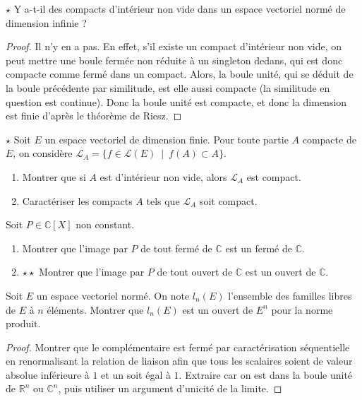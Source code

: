 \documentclass[french,a4paper]{article}
\newcommand{\R}{\mathbb{R}}
\newcommand{\C}{\mathbb{C}}
\theoremstyle{plain}
\theoremstyle{definition}
\theoremstyle{remark}
\begin{document}
\begin{ex}[Moulin.02]{$\star$}
	Y a-t-il des compacts d'intérieur non vide dans un espace vectoriel normé de dimension infinie ?
\end{ex}
\begin{proof}
	Il n'y en a pas. En effet, s'il existe un compact d'intérieur non vide, on peut mettre une boule fermée non réduite à un singleton dedans, qui est donc compacte comme fermé dans un compact. Alors, la boule unité, qui se déduit de la boule précédente par similitude, est elle aussi compacte (la similitude en question est continue). Donc la boule unité est compacte, et donc la dimension est finie d'après le théorème de Riesz.
\end{proof}

\begin{ex}[Moulin.03]{$\star$}
	Soit $E$ un espace vectoriel de dimension finie. Pour toute partie $A$ compacte de $E$, on considère $\mathcal{L}_A=\{f\in\mathcal{L}(E)\ \mid\ f(A)\subset A\}$.
	\begin{enumerate}
		\item Montrer que si $A$ est d'intérieur non vide, alors $\mathcal{L}_A$ est compact.
		\item Caractériser les compacts $A$ tels que $\mathcal{L}_A$ soit compact.
	\end{enumerate}
\end{ex}

\begin{ex}[Moulin.04]{}
	Soit $P\in\C[X]$ non constant.
	\begin{enumerate}
		\item Montrer que l'image par $P$ de tout fermé de $\C$ est un fermé de $\C$.
		\item $\star\star$ Montrer que l'image par $P$ de tout ouvert de $\C$ est un ouvert de $\C$.
	\end{enumerate}
\end{ex}

\begin{ex}[Moulin.05]{}
	Soit $E$ un espace vectoriel normé. On note $l_n(E)$ l'ensemble des familles libres de $E$ à $n$ éléments. Montrer que $l_n(E)$ est un ouvert de $E^n$ pour la norme produit.
\end{ex}
\begin{proof}
	Montrer que le complémentaire est fermé par caractérisation séquentielle en renormalisant la relation de liaison afin que tous les scalaires soient de valeur absolue inférieure à $1$ et un soit égal à $1$. Extraire car on est dans la boule unité de $\R^n$ ou $\C^n$, puis utiliser un argument d'unicité de la limite.
\end{proof}
\end{document}
